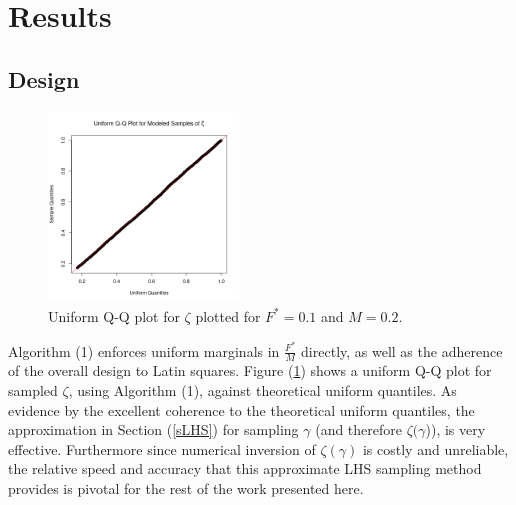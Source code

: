 \section{Results}

%
\subsection{Design}

%
\begin{figure}
\vspace{-1.5cm}
\includegraphics[width=0.45\textwidth]{../gpBias/qqUnif.png}
\vspace{-1cm} %
\caption{Uniform Q-Q plot for $\zeta$ plotted for $F^*=0.1$ and $M=0.2$.}
\label{qqZeta}
\end{figure}

%
Algorithm (1) enforces uniform marginals in $\frac{F^*}{M}$ directly, as well
as the adherence of the overall design to Latin squares.
Figure (\ref{qqZeta}) shows a uniform Q-Q plot for sampled $\zeta$, using
Algorithm (1), against theoretical uniform quantiles. As evidence by the
excellent coherence to the theoretical uniform quantiles, the approximation
in Section (\ref{sLHS}) for sampling $\gamma$ (and therefore $\zeta(\gamma$)),
is very effective.
Furthermore since numerical inversion of $\zeta(\gamma)$ is costly and
unreliable, the relative speed and accuracy that this approximate LHS sampling
method provides is pivotal for the rest of the work presented here. %

